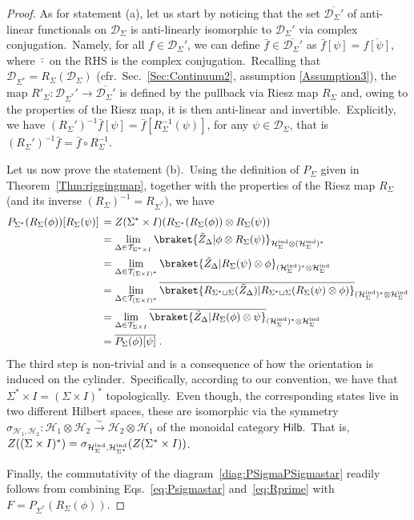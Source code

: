 \documentclass[11pt]{article}
\newcommand{\Hil}{\mathcal{H}}
\newcommand{\cD}{\mathcal{D}}
\newcommand{\Hind}{\mathcal{H}_{\Sigma}^{\rm ind}}
\theoremstyle{definition}
\numberwithin{equation}{section}
\begin{document}
\begin{proof}
    As for statement (a), let us start by noticing that the set $\overline{\mathcal{D}_{\Sigma}'}$ of anti-linear functionals on $\cD_{\Sigma}$ is anti-linearly isomorphic to $\mathcal{D}_{\Sigma}'$ via complex conjugation.~Namely, for all $f\in\mathcal{D}_{\Sigma}'$, we can define $\bar{f}\in\overline{\mathcal{D}_{\Sigma}'}$ as $\bar{f}[\psi]=\overline{f[\psi]}$, where $\bar{\cdot}$ on the RHS is the complex conjugation.~Recalling that $\cD_{\Sigma^*}=R_{\Sigma}(\cD_{\Sigma})$  (cfr.~Sec.~\ref{Sec:Continuum2}, assumption \ref{Assumption3}), the map $R'_{\Sigma}:\cD_{\Sigma^*}'\to \overline{\cD_{\Sigma}'}$ is defined by the pullback via Riesz map $R_{\Sigma}$ and, owing to the properties of the Riesz map, it is then anti-linear and invertible.~Explicitly, we have $(R_{\Sigma}')^{-1}\bar{f}[\psi]=\bar{f}[R_{\Sigma}^{-1}(\psi)]$, for any $\psi\in\cD_{\Sigma}$, that is $(R_{\Sigma}')^{-1}\bar{f}=\bar{f}\circ R_{\Sigma}^{-1}$.

\noindent
Let us now prove the statement (b).~Using the definition of $P_{\Sigma}$ given in Theorem~\ref{Thm:riggingmap}, together with the properties of the Riesz map $R_{\Sigma}$ (and its inverse $(R_{\Sigma})^{-1}=R_{\Sigma^*}$), we have
\begin{equation}\label{steps:Psigmastar}
    \begin{split}
        P_{\Sigma^*}(R_{\Sigma}(\phi))[R_{\Sigma}(\psi)&]\,=Z(\Sigma^*\times I)(R_{\Sigma^*}(R_{\Sigma}(\phi))\otimes R_{\Sigma}(\psi))\\
&\;\,=\lim_{\Delta\in\mathcal{T}_{\Sigma^*\times I}}\braket{\tilde{Z}_{\Delta}|\phi\otimes R_{\Sigma}(\psi)}_{\Hind\otimes(\Hind)^*}\\
&\;\,=\lim_{\Delta\in\mathcal{T}_{(\Sigma\times I)^*}}\braket{\tilde{Z}_{\Delta}|R_{\Sigma}(\psi)\otimes \phi}_{(\Hind)^*\otimes\Hind}\\
&\;\,=\lim_{\Delta\in\mathcal{T}_{(\Sigma\times I)^*}}\overline{\braket{R_{\Sigma^*\sqcup \Sigma}(\tilde{Z}_{\Delta})|R_{\Sigma^*\sqcup \Sigma}(R_{\Sigma}(\psi)\otimes \phi)}}_{(\Hind)^*\otimes\Hind}\\
&\;\,=\lim_{\Delta\in\mathcal{T}_{\Sigma\times I}}\overline{\braket{\tilde{Z}_{\Delta}|R_{\Sigma}(\phi)\otimes \psi}}_{(\Hind)^*\otimes\Hind}\\
&\;\,=\overline{P_{\Sigma}(\phi)[\psi]}\;.
    \end{split}
\end{equation}
The third step is non-trivial and is a consequence of how the orientation is induced on the cylinder.~Specifically, according to our convention, we have that $\Sigma^*\times I=(\Sigma\times I)^*$ topologically.~Even though, the corresponding states live in two different Hilbert spaces, these are isomorphic via the symmetry $\sigma_{\Hil_1,\Hil_2}:\Hil_1\otimes\Hil_2\xrightarrow{\sim}\Hil_2\otimes\Hil_1$ of the monoidal category $\mathsf{Hilb}$.~That is, $Z((\Sigma\times I)^*)=\sigma_{\Hind,\Hil^{\mathrm{ind}}_{\Sigma^*}}(Z(\Sigma^*\times I))$.

Finally, the commutativity of the diagram~\eqref{diag:PSigmaPSigmastar} readily follows from combining Eqs.~\eqref{eq:Psigmastar} and~\eqref{eq:Rprime} with $F=P_{\Sigma^*}(R_{\Sigma}(\phi))$. 
\end{proof}
\end{document}
